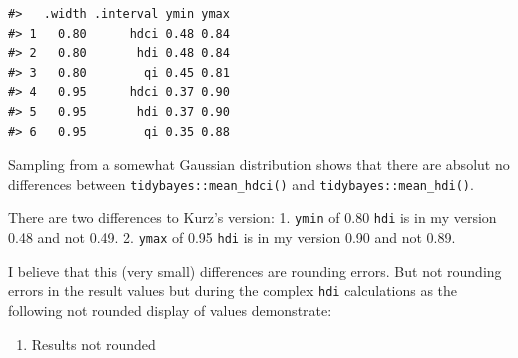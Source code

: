 \documentclass[
  letterpaper,
  DIV=11,
  numbers=noendperiod]{scrreprt}
\newenvironment{Shaded}{\begin{snugshade}}{\end{snugshade}}
\newcommand{\AttributeTok}[1]{\textcolor[rgb]{0.40,0.45,0.13}{#1}}
\newcommand{\CommentTok}[1]{\textcolor[rgb]{0.37,0.37,0.37}{#1}}
\newcommand{\DecValTok}[1]{\textcolor[rgb]{0.68,0.00,0.00}{#1}}
\newcommand{\FunctionTok}[1]{\textcolor[rgb]{0.28,0.35,0.67}{#1}}
\newcommand{\InformationTok}[1]{\textcolor[rgb]{0.37,0.37,0.37}{#1}}
\newcommand{\NormalTok}[1]{\textcolor[rgb]{0.00,0.23,0.31}{#1}}
\newcommand{\SpecialCharTok}[1]{\textcolor[rgb]{0.37,0.37,0.37}{#1}}
\providecommand{\tightlist}{%
  \setlength{\itemsep}{0pt}\setlength{\parskip}{0pt}}\usepackage{longtable,booktabs,array}
\begin{document}
\begin{verbatim}
#>   .width .interval ymin ymax
#> 1   0.80      hdci 0.48 0.84
#> 2   0.80       hdi 0.48 0.84
#> 3   0.80        qi 0.45 0.81
#> 4   0.95      hdci 0.37 0.90
#> 5   0.95       hdi 0.37 0.90
#> 6   0.95        qi 0.35 0.88
\end{verbatim}

Sampling from a somewhat Gaussian distribution shows that there are
absolut no differences between \texttt{tidybayes::mean\_hdci()} and
\texttt{tidybayes::mean\_hdi()}.

There are two differences to Kurz's version: 1. \texttt{ymin} of 0.80
\texttt{hdi} is in my version 0.48 and not 0.49. 2. \texttt{ymax} of
0.95 \texttt{hdi} is in my version 0.90 and not 0.89.

I believe that this (very small) differences are rounding errors. But
not rounding errors in the result values but during the complex
\texttt{hdi} calculations as the following not rounded display of values
demonstrate:

\begin{enumerate}
\def\labelenumi{\alph{enumi})}
\setcounter{enumi}{1}
\tightlist
\item
  Results not rounded
\end{enumerate}

\begin{Shaded}
\end{Shaded}
\end{document}
